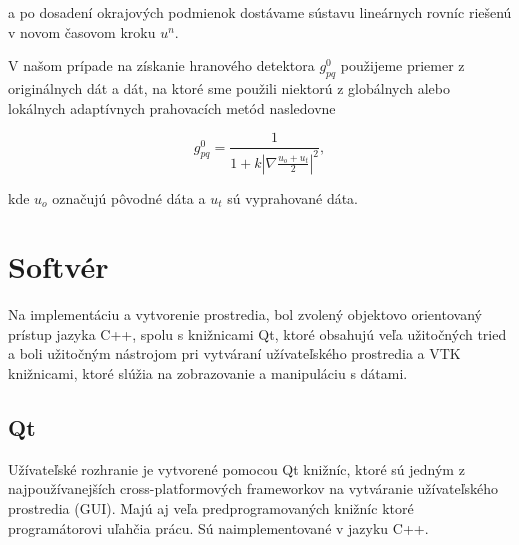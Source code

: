\documentclass[a4paper,11pt,twoside]{article}%
\begin{document}
a po dosadení okrajových podmienok dostávame sústavu lineárnych rovníc riešenú v novom časovom kroku $u^n$.

V našom prípade na získanie hranového detektora $g_{pq}^{0}$ použijeme priemer z originálnych dát a dát, na ktoré sme použili niektorú z globálnych alebo lokálnych adaptívnych prahovacích metód nasledovne

\begin{equation}
g_{pq}^{0} = \frac{1}{1 + k|\nabla \frac{u_o + u_t}{2}|^2},
\end{equation}

kde $u_o$ označujú pôvodné dáta a $u_t$ sú vyprahované dáta. 

\newpage
\section{Softvér}

Na implementáciu a vytvorenie prostredia, bol zvolený objektovo orientovaný prístup jazyka C++, spolu s knižnicami Qt, ktoré obsahujú veľa užitočných tried a boli užitočným nástrojom pri vytváraní užívateľského prostredia a VTK knižnicami, ktoré slúžia na zobrazovanie a manipuláciu s dátami.

\subsection{Qt}
Užívateľské rozhranie je vytvorené pomocou Qt knižníc, ktoré sú jedným z najpoužívanejších cross-platformových frameworkov na vytváranie užívateľského prostredia (GUI). Majú aj veľa predprogramovaných knižníc ktoré programátorovi uľahčia prácu. Sú naimplementované v jazyku C++. 
\end{document}
